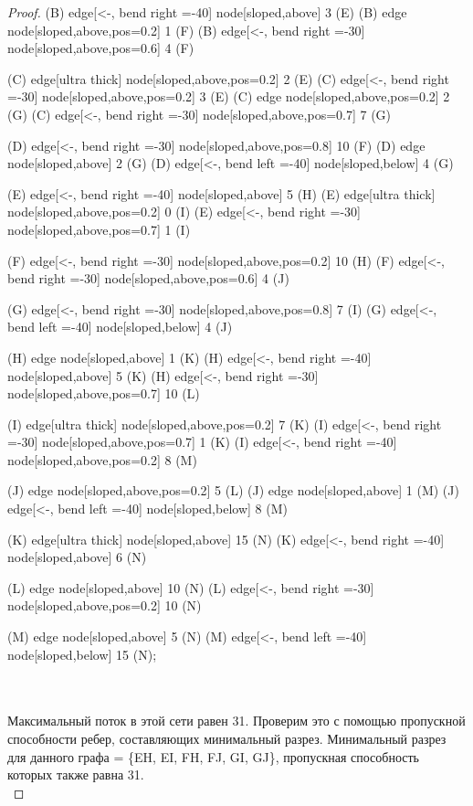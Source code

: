 \begin{proof}
{    (B) edge[<-, bend right =-40] node[sloped,above] {3} (E)
    (B) edge node[sloped,above,pos=0.2] {1} (F)
    (B) edge[<-, bend right =-30] node[sloped,above,pos=0.6] {4} (F)
    
    (C) edge[ultra thick] node[sloped,above,pos=0.2] {2} (E)
    (C) edge[<-, bend right =-30] node[sloped,above,pos=0.2] {3} (E)
    (C) edge node[sloped,above,pos=0.2] {2} (G)
    (C) edge[<-, bend right =-30] node[sloped,above,pos=0.7] {7} (G)

    (D) edge[<-, bend right =-30] node[sloped,above,pos=0.8] {10} (F)
    (D) edge node[sloped,above] {2} (G)
    (D) edge[<-, bend left =-40] node[sloped,below] {4} (G)
    
    (E) edge[<-, bend right =-40] node[sloped,above] {5} (H)
    (E) edge[ultra thick] node[sloped,above,pos=0.2] {0} (I)
    (E) edge[<-, bend right =-30] node[sloped,above,pos=0.7] {1} (I)
    
    (F) edge[<-, bend right =-30] node[sloped,above,pos=0.2] {10} (H)
    (F) edge[<-, bend right =-30] node[sloped,above,pos=0.6] {4} (J)
    
    (G) edge[<-, bend right =-30] node[sloped,above,pos=0.8] {7} (I)
    (G) edge[<-, bend left =-40] node[sloped,below] {4} (J)
    
    (H) edge node[sloped,above] {1} (K)
    (H) edge[<-, bend right =-40] node[sloped,above] {5} (K)
    (H) edge[<-, bend right =-30] node[sloped,above,pos=0.7] {10} (L)
    
    (I) edge[ultra thick] node[sloped,above,pos=0.2] {7} (K)
    (I) edge[<-, bend right =-30] node[sloped,above,pos=0.7] {1} (K)
    (I) edge[<-, bend right =-40] node[sloped,above,pos=0.2] {8} (M)
    
    (J) edge node[sloped,above,pos=0.2] {5} (L)
    (J) edge node[sloped,above] {1} (M)
    (J) edge[<-, bend left =-40] node[sloped,below] {8} (M)
    
    (K) edge[ultra thick] node[sloped,above] {15} (N)
    (K) edge[<-, bend right =-40] node[sloped,above] {6} (N)
    
    (L) edge node[sloped,above] {10} (N)
    (L) edge[<-, bend right =-30] node[sloped,above,pos=0.2] {10} (N)
    
    (M) edge node[sloped,above] {5} (N)
    (M) edge[<-, bend left =-40] node[sloped,below] {15} (N);
    }\\\\
Максимальный поток в этой сети равен 31. Проверим это с помощью пропускной способности ребер, составляющих минимальный разрез. Минимальный разрез для данного графа = \{EH, EI, FH, FJ, GI, GJ\}, пропускная способность которых также равна 31.\\
    \usetikzlibrary{graphs,automata,positioning}
\end{proof}
